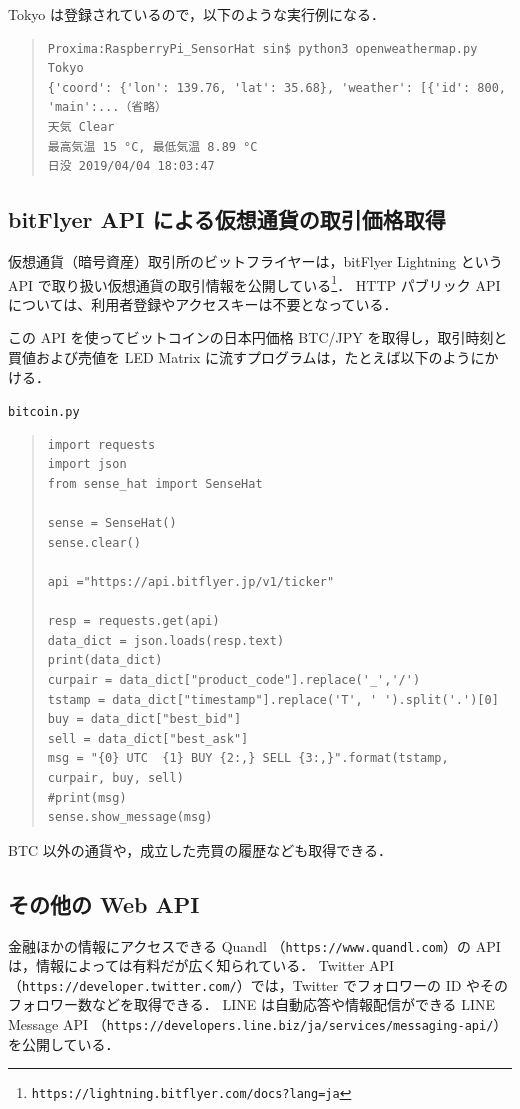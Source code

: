 \documentclass[11pt,a4,epsf]{report}
\begin{document}
Tokyo は登録されているので，以下のような実行例になる．
\begin{quote}
\small
\begin{verbatim}
Proxima:RaspberryPi_SensorHat sin$ python3 openweathermap.py Tokyo
{'coord': {'lon': 139.76, 'lat': 35.68}, 'weather': [{'id': 800, 'main':...（省略）
天気 Clear
最高気温 15 °C, 最低気温 8.89 °C
日没 2019/04/04 18:03:47
\end{verbatim}
\end{quote}

\subsection{bitFlyer API による仮想通貨の取引価格取得}

仮想通貨（暗号資産）取引所のビットフライヤーは，bitFlyer Lightning という API で取り扱い仮想通貨の取引情報を公開している\footnote{{\tt https://lightning.bitflyer.com/docs?lang=ja} }．
HTTP パブリック API については、利用者登録やアクセスキーは不要となっている．

この API を使ってビットコインの日本円価格 BTC/JPY を取得し，取引時刻と買値および売値を LED Matrix に流すプログラムは，たとえば以下のようにかける．
\begin{itembox}[l]{\tt bitcoin.py}
\begin{quote}
\small
\begin{verbatim}
import requests
import json
from sense_hat import SenseHat

sense = SenseHat()
sense.clear()
 
api ="https://api.bitflyer.jp/v1/ticker"
 
resp = requests.get(api)
data_dict = json.loads(resp.text) 
print(data_dict)
curpair = data_dict["product_code"].replace('_','/')
tstamp = data_dict["timestamp"].replace('T', ' ').split('.')[0]
buy = data_dict["best_bid"]
sell = data_dict["best_ask"]
msg = "{0} UTC  {1} BUY {2:,} SELL {3:,}".format(tstamp, curpair, buy, sell)
#print(msg)
sense.show_message(msg)
\end{verbatim}
\end{quote}
\end{itembox}
BTC 以外の通貨や，成立した売買の履歴なども取得できる．

\subsection{その他の Web API}

金融ほかの情報にアクセスできる Quandl （\verb+https://www.quandl.com+）の API は，情報によっては有料だが広く知られている．
Twitter API （\verb+https://developer.twitter.com/+）では，Twitter でフォロワーの ID やそのフォロワー数などを取得できる．
LINE は自動応答や情報配信ができる LINE Message API （\verb+https://developers.line.biz/ja/services/messaging-api/+）を公開している．
\end{document}
